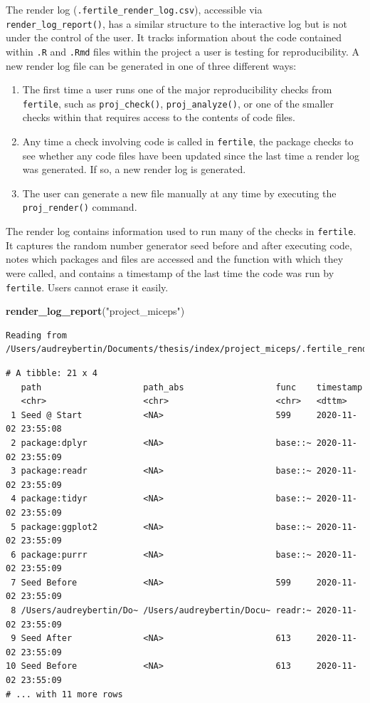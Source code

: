 \documentclass[12pt,twoside]{reedthesis}
\newenvironment{Shaded}{\begin{snugshade}}{\end{snugshade}}
\newcommand{\KeywordTok}[1]{\textcolor[rgb]{0.13,0.29,0.53}{\textbf{#1}}}
\newcommand{\StringTok}[1]{\textcolor[rgb]{0.31,0.60,0.02}{#1}}
\newcommand{\NormalTok}[1]{#1}
\begin{document}
The render log (\texttt{.fertile\_render\_log.csv}), accessible via
\texttt{render\_log\_report()}, has a similar structure to the
interactive log but is not under the control of the user. It tracks
information about the code contained within \texttt{.R} and
\texttt{.Rmd} files within the project a user is testing for
reproducibility. A new render log file can be generated in one of three
different ways:
\begin{enumerate}
\def\labelenumi{\arabic{enumi}.}
\item
  The first time a user runs one of the major reproducibility checks
  from \texttt{fertile}, such as \texttt{proj\_check()},
  \texttt{proj\_analyze()}, or one of the smaller checks within that
  requires access to the contents of code files.
\item
  Any time a check involving code is called in \texttt{fertile}, the
  package checks to see whether any code files have been updated since
  the last time a render log was generated. If so, a new render log is
  generated.
\item
  The user can generate a new file manually at any time by executing the
  \texttt{proj\_render()} command.
\end{enumerate}
The render log contains information used to run many of the checks in
\texttt{fertile}. It captures the random number generator seed before
and after executing code, notes which packages and files are accessed
and the function with which they were called, and contains a timestamp
of the last time the code was run by \texttt{fertile}. Users cannot
erase it easily.
\begin{Shaded}
\begin{Highlighting}[]
\KeywordTok{render_log_report}\NormalTok{(}\StringTok{"project_miceps"}\NormalTok{)}
\end{Highlighting}
\end{Shaded}
\begin{verbatim}
Reading from /Users/audreybertin/Documents/thesis/index/project_miceps/.fertile_render_log.csv
\end{verbatim}
\begin{verbatim}
# A tibble: 21 x 4
   path                    path_abs                  func    timestamp          
   <chr>                   <chr>                     <chr>   <dttm>             
 1 Seed @ Start            <NA>                      599     2020-11-02 23:55:08
 2 package:dplyr           <NA>                      base::~ 2020-11-02 23:55:09
 3 package:readr           <NA>                      base::~ 2020-11-02 23:55:09
 4 package:tidyr           <NA>                      base::~ 2020-11-02 23:55:09
 5 package:ggplot2         <NA>                      base::~ 2020-11-02 23:55:09
 6 package:purrr           <NA>                      base::~ 2020-11-02 23:55:09
 7 Seed Before             <NA>                      599     2020-11-02 23:55:09
 8 /Users/audreybertin/Do~ /Users/audreybertin/Docu~ readr:~ 2020-11-02 23:55:09
 9 Seed After              <NA>                      613     2020-11-02 23:55:09
10 Seed Before             <NA>                      613     2020-11-02 23:55:09
# ... with 11 more rows
\end{verbatim}
\end{document}
